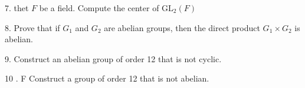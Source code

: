 \begin{mdframed}[style=darkQuesion]
  7. thet $F$ be a field. Compute the center of $\mathrm{GL}_{2}(F)$
\end{mdframed}
\begin{mdframed}[style=darkAnswer,frametitle={Joe Starr}]
\end{mdframed}
\newpage
\begin{mdframed}[style=darkQuesion]
  8. Prove that if $G_{1}$ and $G_{2}$ are abelian groups, then the direct product $G_{1} \times G_{2}$ is abelian.
\end{mdframed}
\begin{mdframed}[style=darkAnswer,frametitle={Joe Starr}]
\end{mdframed}
\newpage
\begin{mdframed}[style=darkQuesion]
  9. Construct an abelian group of order 12 that is not cyclic.
\end{mdframed}
\begin{mdframed}[style=darkAnswer,frametitle={Joe Starr}]
\end{mdframed}
\newpage
\begin{mdframed}[style=darkQuesion]
  10 . F Construct a group of order 12 that is not abelian.
\end{mdframed}
